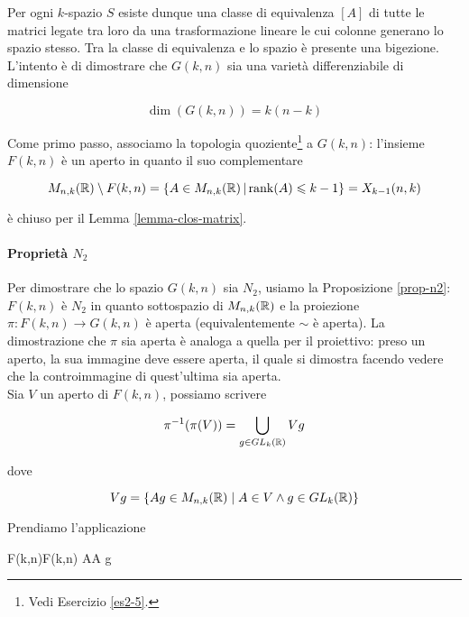 Per ogni $ k $-spazio $ S $ esiste dunque una classe di equivalenza $ [A] $ di tutte le matrici legate tra loro da una trasformazione lineare le cui colonne generano lo spazio stesso. Tra la classe di equivalenza e lo spazio è presente una bigezione.\\
L'intento è di dimostrare che $ G(k,n) $ sia una varietà differenziabile di dimensione

\begin{equation}
	\dim (G(k,n)) = k (n-k)
\end{equation}

Come primo passo, associamo la topologia quoziente\footnote{%
	Vedi Esercizio \ref{es2-5}.%
} a $ G(k,n) $: l'insieme $ F(k,n) $ è un aperto in quanto il suo complementare

\begin{equation}
	M_{n,k}(\mathbb{R}) \setminus F(k,n) = \left\{ A \in M_{n,k}(\mathbb{R}) \, \middle| \, \rank(A) \leqslant k - 1 \right\} = X_{k-1} (n,k)
\end{equation}

è chiuso per il Lemma \ref{lemma-clos-matrix}.

\paragraph{Proprietà $ N_{2} $}

Per dimostrare che lo spazio $ G(k,n) $ sia $ N_{2} $, usiamo la Proposizione \ref{prop-n2}: $ F(k,n) $ è $ N_{2} $ in quanto sottospazio di $ M_{n,k}(\mathbb{R}) $ e la proiezione $ \pi : F(k,n) \to G(k,n) $ è aperta (equivalentemente $ \sim $ è aperta).
La dimostrazione che $ \pi $ sia aperta è analoga a quella per il proiettivo: preso un aperto, la sua immagine deve essere aperta, il quale si dimostra facendo vedere che la controimmagine di quest'ultima sia aperta.\\
Sia $ V $ un aperto di $ F(k,n) $, possiamo scrivere

\begin{equation}
	\pi^{-1}(\pi(V)) = \bigcup_{g \in GL_{k}(\mathbb{R})} V g
\end{equation}

dove

\begin{equation}
	V g = \{ A g \in M_{n,k}(\mathbb{R}) \mid A \in V \wedge g \in GL_{k}(\mathbb{R}) \}
\end{equation}

Prendiamo l'applicazione

	{F(k,n)}{F(k,n)}
	{A}{A g}

